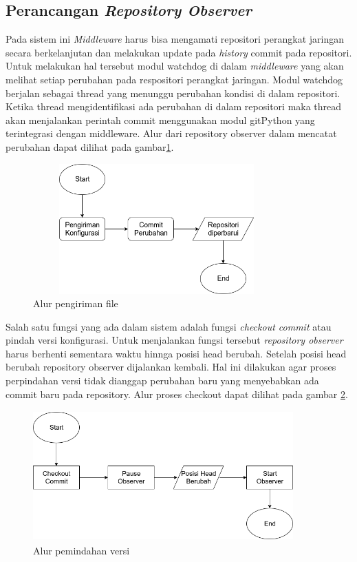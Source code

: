         \subsection{Perancangan \textit{Repository Observer}}
            Pada sistem ini \textit{Middleware} harus bisa mengamati repositori perangkat jaringan secara berkelanjutan dan melakukan update pada \textit{history} commit pada repositori. Untuk melakukan hal tersebut modul watchdog di dalam \textit{middleware} yang akan melihat setiap perubahan pada respositori perangkat jaringan. Modul watchdog berjalan sebagai thread yang menunggu perubahan kondisi di dalam repositori. Ketika thread mengidentifikasi ada perubahan di dalam repositori maka thread akan menjalankan perintah commit menggunakan modul gitPython yang terintegrasi dengan middleware. Alur dari repository observer dalam mencatat perubahan dapat dilihat pada gambar\ref{desain_pengirimanfile}.
            \begin{figure}[H]
            	\centering
            	\includegraphics[width=9.5cm,height=5cm]{Images/C-3/AlurPengirimanFile.png}
            	\caption{Alur pengiriman file}
            	\label{desain_pengirimanfile}
            \end{figure}
        	\indent Salah satu fungsi yang ada dalam sistem adalah fungsi \textit{checkout commit} atau pindah versi konfigurasi. Untuk menjalankan fungsi tersebut \textit{repository observer} harus berhenti sementara waktu hinnga posisi head berubah. Setelah posisi head berubah repository observer dijalankan kembali. Hal ini dilakukan agar proses perpindahan versi tidak dianggap perubahan baru yang menyebabkan ada commit baru pada repository. Alur proses checkout dapat dilihat pada gambar \ref{CheckoutBranch}.
        	 \begin{figure}[H]
        		\centering
        		\includegraphics[width=10cm,height=5cm]{Images/C-3/Flow-Checkout.png}
        		\caption{Alur pemindahan versi}
        		\label{CheckoutBranch}
        	\end{figure}
